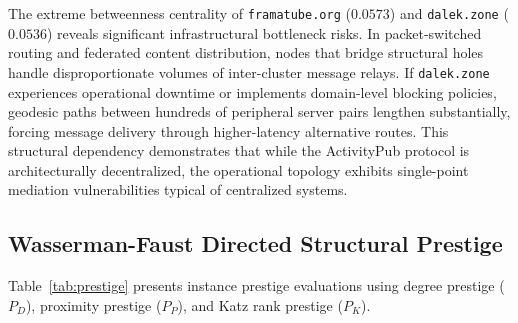 \documentclass[conference]{IEEEtran}
\begin{document}
The extreme betweenness centrality of \texttt{framatube.org} ($0.0573$) and \texttt{dalek.zone} ($0.0536$) reveals significant infrastructural bottleneck risks. In packet-switched routing and federated content distribution, nodes that bridge structural holes handle disproportionate volumes of inter-cluster message relays. If \texttt{dalek.zone} experiences operational downtime or implements domain-level blocking policies, geodesic paths between hundreds of peripheral server pairs lengthen substantially, forcing message delivery through higher-latency alternative routes. This structural dependency demonstrates that while the ActivityPub protocol is architecturally decentralized, the operational topology exhibits single-point mediation vulnerabilities typical of centralized systems.


\subsection{Wasserman-Faust Directed Structural Prestige}

Table~\ref{tab:prestige} presents instance prestige evaluations using degree prestige ($P_D$), proximity prestige ($P_P$), and Katz rank prestige ($P_K$).

\begin{table}[htbp]
\caption{Wasserman-Faust Structural Prestige Rankings Across Federated Instances}
\label{tab:prestige}
\centering
{}
\end{table}
\end{document}
